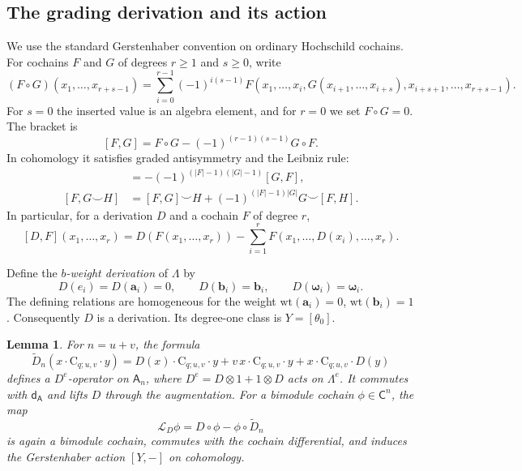 \documentclass[a4paper,11pt,oneside,reqno]{amsart}
\newtheorem{lemma}[theorem]{Lemma}
\theoremstyle{definition}
\numberwithin{equation}{section}
\begin{document}
\subsection{The grading derivation and its action}

We use the standard Gerstenhaber convention on ordinary Hochschild
cochains.  For cochains $F$ and $G$ of degrees $r\ge1$ and $s\ge0$,
write
\begin{equation}\label{gerst:insertion}
 (F\circ G)(x_1,\ldots,x_{r+s-1})
 =\sum_{i=0}^{r-1}(-1)^{i(s-1)}
 F(x_1,\ldots,x_i,G(x_{i+1},\ldots,x_{i+s}),
 x_{i+s+1},\ldots,x_{r+s-1}).
\end{equation}
For $s=0$ the inserted value is an algebra element, and for $r=0$
we set $F\circ G=0$.  The bracket is
\begin{equation}\label{gerst:bar-bracket}
 [F,G]=F\circ G-(-1)^{(r-1)(s-1)}G\circ F.
\end{equation}
In cohomology it satisfies graded antisymmetry and the Leibniz rule:
\begin{align}
 [F,G]&=-(-1)^{(|F|-1)(|G|-1)}[G,F],
 \label{gerst:antisymmetry}\\
 [F,G\smile H]&=[F,G]\smile H
 +(-1)^{(|F|-1)|G|}G\smile[F,H].
 \label{gerst:leibniz}
\end{align}
In particular, for a derivation $D$ and a cochain $F$ of degree $r$,
\begin{equation}\label{gerst:derivation-bar-action}
 [D,F](x_1,\ldots,x_r)
 =D(F(x_1,\ldots,x_r))
 -\sum_{i=1}^r F(x_1,\ldots,D(x_i),\ldots,x_r).
\end{equation}

Define the \emph{$b$-weight derivation} of $\Lambda$ by
\begin{equation}\label{gerst:derivation}
 D(e_i)=D(\mathbf a_i)=0,\qquad
 D(\mathbf b_i)=\mathbf b_i,\qquad
 D(\boldsymbol\omega_i)=\boldsymbol\omega_i.
\end{equation}
The defining relations are homogeneous for the weight
$\mathrm{wt}(\mathbf a_i)=0$, $\mathrm{wt}(\mathbf b_i)=1$.
Consequently $D$ is a derivation.  Its degree-one class is
$Y=[\theta_0]$.

\begin{lemma}\label{gerst:derivation-lift}
For $n=u+v$, the formula
\begin{equation}\label{gerst:lift-formula}
 \widetilde D_n(x\cdot\mathrm C_{q;u,v}\cdot y)
 =D(x)\cdot\mathrm C_{q;u,v}\cdot y
 +v\,x\cdot\mathrm C_{q;u,v}\cdot y
 +x\cdot\mathrm C_{q;u,v}\cdot D(y)
\end{equation}
defines a $D^e$-operator on $\mathsf A_n$, where
$D^e=D\otimes1+1\otimes D$ acts on $\Lambda^e$.
It commutes with $\mathsf d_{\mathsf A}$ and lifts $D$ through the
augmentation.  For a bimodule cochain $\phi\in\mathsf C^n$, the map
\begin{equation}\label{gerst:lift-action}
 \mathcal L_D\phi=D\circ\phi-\phi\circ\widetilde D_n
\end{equation}
is again a bimodule cochain, commutes with the cochain differential,
and induces the Gerstenhaber action $[Y,-]$ on cohomology.
\end{lemma}
\end{document}
